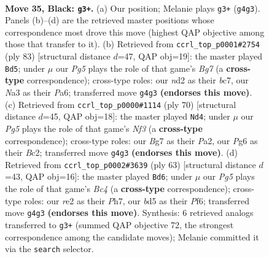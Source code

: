 \documentclass[11pt]{article}
\begin{document}
\clearpage

\begin{figure}[p]\centering
\begin{subfigure}{0.46\textwidth}\centering
\resizebox{\linewidth}{!}{%
\newchessgame
\chessboard[
  setfen={Q7/6b1/1p3kp1/2pB4/6pP/n7/3NR2K/2r5 b - - 0 35},
  showmover=false,
  pgfstyle=straightmove, color=movearrow, markmove={g4-g3}
]}
\caption{}
\end{subfigure}\hfill
\begin{subfigure}{0.46\textwidth}\centering
\resizebox{\linewidth}{!}{%
\newchessgame
\chessboard[
  setfen={r7/2B5/p2N1pk1/2N3p1/1P6/4K1P1/6b1/8 b - - 5 42},
  showmover=false,
  pgfstyle=straightmove, color=movearrow, markmove={g2-d5}
]}
\caption{}
\end{subfigure}
\\[4pt]
\begin{subfigure}{0.46\textwidth}\centering
\resizebox{\linewidth}{!}{%
\newchessgame
\chessboard[
  setfen={2r1b3/5k2/5p2/ppnP4/4P3/5N2/PKB3R1/8 w - - 4 36},
  showmover=false,
  pgfstyle=straightmove, color=movearrow, markmove={f3-d4}
]}
\caption{}
\end{subfigure}\hfill
\begin{subfigure}{0.46\textwidth}\centering
\resizebox{\linewidth}{!}{%
\newchessgame
\chessboard[
  setfen={6k1/1p5p/5pp1/1Bbp4/8/7P/5r1P/3RN2K b - - 3 32},
  showmover=false,
  pgfstyle=straightmove, color=movearrow, markmove={c5-d6}
]}
\caption{}
\end{subfigure}
\caption{\textbf{Move 35, Black: \texttt{g3+}.} (a) Our position; Melanie plays \texttt{g3+} (\texttt{g4g3}). Panels (b)--(d) are the retrieved master positions whose correspondence most drove this move (highest QAP objective among those that transfer to it). (b) Retrieved from \texttt{ccrl\_top\_p0001\#2754} (ply 83) [structural distance $d$=47, QAP obj=19]: the master played \texttt{Bd5}; under $\mu$ our \emph{Pg5} plays the role of that game's \emph{Bg7} (a \textbf{cross-type} correspondence); cross-type roles: our \emph{n}d2 as their \emph{b}c7, our \emph{N}a3 as their \emph{P}a6; transferred move \texttt{g4g3} \textbf{(endorses this move)}. (c) Retrieved from \texttt{ccrl\_top\_p0000\#1114} (ply 70) [structural distance $d$=45, QAP obj=18]: the master played \texttt{Nd4}; under $\mu$ our \emph{Pg5} plays the role of that game's \emph{Nf3} (a \textbf{cross-type} correspondence); cross-type roles: our \emph{B}g7 as their \emph{P}a2, our \emph{P}g6 as their \emph{B}c2; transferred move \texttt{g4g3} \textbf{(endorses this move)}. (d) Retrieved from \texttt{ccrl\_top\_p0002\#3639} (ply 63) [structural distance $d$=43, QAP obj=16]: the master played \texttt{Bd6}; under $\mu$ our \emph{Pg5} plays the role of that game's \emph{Bc4} (a \textbf{cross-type} correspondence); cross-type roles: our \emph{r}e2 as their \emph{P}h7, our \emph{b}d5 as their \emph{P}f6; transferred move \texttt{g4g3} \textbf{(endorses this move)}. Synthesis: 6 retrieved analogs transferred to \texttt{g3+} (summed QAP objective 72, the strongest correspondence among the candidate moves); Melanie committed it via the \texttt{search} selector.}
\label{fig:thought-m69}
\end{figure}
\end{document}

